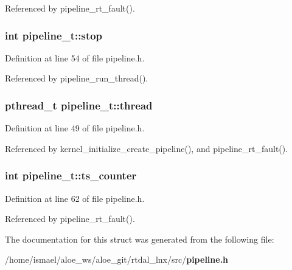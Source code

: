 Referenced by pipeline\-\_\-rt\-\_\-fault().

\subsubsection[{stop}]{\setlength{\rightskip}{0pt plus 5cm}int pipeline\-\_\-t\-::stop}\label{structpipeline__t_ab5d965c3c5c84d69165351e7d7b70e80}


Definition at line 54 of file pipeline.\-h.



Referenced by pipeline\-\_\-run\-\_\-thread().

\subsubsection[{thread}]{\setlength{\rightskip}{0pt plus 5cm}pthread\-\_\-t pipeline\-\_\-t\-::thread}\label{structpipeline__t_ab506a10f907e26976e2784e7b4d3075d}


Definition at line 49 of file pipeline.\-h.



Referenced by kernel\-\_\-initialize\-\_\-create\-\_\-pipeline(), and pipeline\-\_\-rt\-\_\-fault().

\subsubsection[{ts\-\_\-counter}]{\setlength{\rightskip}{0pt plus 5cm}int pipeline\-\_\-t\-::ts\-\_\-counter}\label{structpipeline__t_ada6cb4fb46dcc2966c0237c2e24db1ed}


Definition at line 62 of file pipeline.\-h.



Referenced by pipeline\-\_\-rt\-\_\-fault().



The documentation for this struct was generated from the following file\-:\begin{DoxyCompactItemize}
\item 
/home/ismael/aloe\-\_\-ws/aloe\-\_\-git/rtdal\-\_\-lnx/src/{\bf pipeline.\-h}\end{DoxyCompactItemize}
